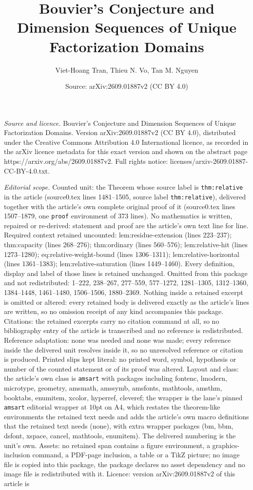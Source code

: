 \documentclass[10pt,a4paper]{amsart}
\title[Bouvier's Conjecture and Dimension Sequences of Unique Facto]{Bouvier's Conjecture and Dimension Sequences of Unique Factorization Domains}
\author{Viet-Hoang Tran, Thieu N. Vo, Tan M. Nguyen}
\date{Source: arXiv:2609.01887v2 (CC BY 4.0)}
\begin{document}
\maketitle

\noindent\emph{Source and licence.} Bouvier's Conjecture and Dimension Sequences of Unique Factorization Domains. Version arXiv:2609.01887v2 (CC BY 4.0), distributed under the Creative Commons Attribution 4.0 International licence, as recorded in the arXiv licence metadata for this exact version and shown on the abstract page https://arxiv.org/abs/2609.01887v2. Full rights notice: licenses/arxiv-2609.01887-CC-BY-4.0.txt.\par\smallskip

\noindent\textit{Editorial scope.} Counted unit: the Theorem whose source label is \texttt{thm:relative} in the article (source0.tex lines 1481--1505, source label \texttt{thm:relative}), delivered together with the article's own complete original proof of it (source0.tex lines 1507--1879, one \texttt{proof} environment of 373 lines). No mathematics is written, repaired or re-derived: statement and proof are the article's own text line for line. Required context retained uncounted: lem:residue-extension (lines 223--237); thm:capacity (lines 268--276); thm:ordinary (lines 560--576); lem:relative-hit (lines 1273--1280); eq:relative-weight-bound (lines 1306--1311); lem:relative-horizontal (lines 1361--1383); lem:relative-saturation (lines 1449--1460). Every definition, display and label of those lines is retained unchanged. Omitted from this package and not redistributed: 1--222, 238--267, 277--559, 577--1272, 1281--1305, 1312--1360, 1384--1448, 1461--1480, 1506--1506, 1880--2369. Nothing inside a retained excerpt is omitted or altered: every retained body is delivered exactly as the article's lines are written, so no omission receipt of any kind accompanies this package. Citations: the retained excerpts carry no citation command at all, so no bibliography entry of the article is transcribed and no reference is redistributed. Reference adaptation: none was needed and none was made; every reference inside the delivered unit resolves inside it, so no unresolved reference or citation is produced. Printed slips kept literal: no printed word, symbol, hypothesis or number of the counted statement or of its proof was altered. Layout and class: the article's own class is \texttt{amsart} with packages including fontenc, lmodern, microtype, geometry, amsmath, amssymb, amsfonts, mathtools, amsthm, booktabs, enumitem, xcolor, hyperref, cleveref; the wrapper is the lane's pinned \texttt{amsart} editorial wrapper at 10pt on A4, which restates the theorem-like environments the retained text needs and adds the article's own macro definitions that the retained text needs (none), with extra wrapper packages (bm, bbm, dsfont, xspace, cancel, mathtools, enumitem). The delivered numbering is the unit's own. Assets: no retained span contains a figure environment, a graphics-inclusion command, a PDF-page inclusion, a table or a TikZ picture; no image file is copied into this package, the package declares no asset dependency and no image file is redistributed with it. Licence: version arXiv:2609.01887v2 of this article is 
\end{document}
